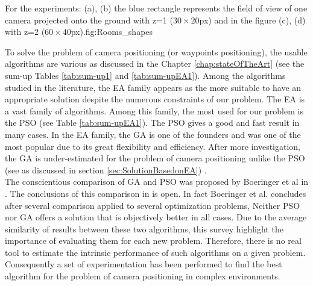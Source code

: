  \begin{mfigures}[!]{For the experiments: (a), (b) the blue rectangle represents the field of view of one camera projected onto the ground  with z=1 ($30 \times 20 $px) and in the figure (c), (d) with z=2 ($60 \times 40 $px).}{fig:Rooms_shapes} \centering
{}
\hspace{1cm}
\hspace{1cm}
\end{mfigures}  
To solve the problem of camera positioning (or waypoints positioning), the usable algorithms are various as  discussed in the Chapter \ref{chap:stateOfTheArt} (see the sum-up Tables \ref{tab:sum-up1} and \ref{tab:sum-upEA1}).
Among the algorithms studied in the literature, the EA family appears as the more suitable to have an appropriate solution despite the numerous constraints of our problem. The EA is a vast family of algorithms. Among this family, the most used for our problem is the PSO (see  Table \ref{tab:sum-upEA1}). The PSO gives a good and fast result in many cases. In the EA family, the GA is one of the founders and was one of the most popular due to its great flexibility and efficiency.
 After more investigation, the GA is under-estimated for the problem of camera positioning unlike the PSO (see \citep{33*reddy2012,8*zhou2011,84*xu2011,143*maji2015,193*fu2014,194*fu2010} as discussed in section \ref{sec:SolutionBasedonEA}) . \\
 The  conscientious comparison  of GA and PSO was proposed by Boeringer et al in \citep{78*boeringer2004}. The conclusions  of this comparison in \citep{78*boeringer2004} is open. In fact Boeringer et al.  \citep{78*boeringer2004} concludes after several comparison applied to several optimization problems, Neither PSO nor GA offers a solution that is objectively better in all cases. Due to the average similarity of results between these two algorithms, this survey highlight the importance of evaluating them for each new problem.
  Therefore, there is no real tool to estimate the intrinsic performance of such algorithms on a given problem.
 Consequently a set  of experimentation has been performed to find the best algorithm for the problem of camera positioning in complex environments. 



